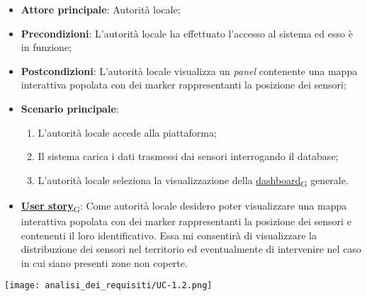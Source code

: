\begin{itemize}
	\item \textbf{Attore principale}: Autorità locale;
	\item \textbf{Precondizioni}: L'autorità locale ha effettuato l'accesso al sistema ed esso è in funzione;
	\item \textbf{Postcondizioni}: L'autorità locale visualizza un \textit{panel} contenente una mappa interattiva
	      popolata con dei marker rappresentanti la posizione dei sensori;
	\item \textbf{Scenario principale}:
	      \begin{enumerate}
		      \item L'autorità locale accede alla piattaforma;
		      \item Il sistema carica i dati trasmessi dai sensori interrogando il database;
		      \item L'autorità locale seleziona la visualizzazione della \href{https://7last.github.io/docs/rtb/documentazione-interna/glossario\#dashboard}{dashboard\textsubscript{G}} generale.
	      \end{enumerate}
	\item \href{https://7last.github.io/docs/rtb/documentazione-interna/glossario\#user-story}{\textbf{User story}\textsubscript{G}}: Come autorità locale desidero poter visualizzare una mappa interattiva popolata con dei marker rappresentanti
	      la posizione dei sensori e contenenti il loro identificativo. Essa mi consentirà di visualizzare la distribuzione dei sensori nel territorio
	      ed eventualmente di intervenire nel caso in cui siano presenti zone non coperte.
\end{itemize}
\begin{center}
	\texttt{[image: analisi\_dei\_requisiti/UC-1.2.png]}
\end{center}

